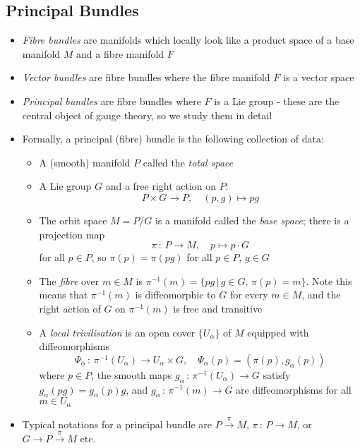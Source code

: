 \documentclass[12pt,a4paper]{article}
\numberwithin{equation}{section}
\begin{document}
	\subsection{Principal Bundles}
	\begin{itemize}
		\item \textit{Fibre bundles} are manifolds which locally look like a product space of a base manifold $M$ and a fibre manifold $F$
		\item \textit{Vector bundles} are fibre bundles where the fibre manifold $F$ is a vector space
		\item \textit{Principal bundles} are fibre bundles where $F$ is a Lie group - these are the central object of gauge theory, so we study them in detail
		\item Formally, a principal (fibre) bundle is the following collection of data:
		\begin{itemize}
			\item A (smooth) manifold $P$ called the \textit{total space}
			\item A Lie group $G$ and a free right action on $P$:
			\begin{equation}
				P\times G\to P,\quad (p,g)\mapsto pg
			\end{equation}
			\item The orbit space $M=P/G$ is a manifold called the \textit{base space}; there is a projection map
			\begin{equation}
				\pi\,:\,P\to M,\quad p\mapsto p\cdot G
			\end{equation}
			for all $p\in P$, so $\pi(p)=\pi(pg)$ for all $p\in P,\,g\in G$
			\item The \textit{fibre} over $m\in M$ is $\pi^{-1}(m)=\{pg\,|\,g\in G,\,\pi(p)=m\}$. Note this means that $\pi^{-1}(m)$ is diffeomorphic to $G$ for every $m\in M$, and the right action of $G$ on $\pi^{-1}(m)$ is free and transitive
			\item A \textit{local trivilisation} is an open cover $\{U_{\alpha}\}$ of $M$ equipped with diffeomorphisms
			\begin{equation}
				\Psi_{\alpha}\,:\,\pi^{-1}(U_{\alpha})\to U_{\alpha}\times G,\quad \Psi_{\alpha}(p)=(\pi(p),g_{\alpha}(p))
			\end{equation}
			where $p\in P$, the smooth maps $g_{\alpha}\,:\,\pi^{-1}(U_{\alpha})\to G$ satisfy $g_{\alpha}(pg)=g_{\alpha}(p)g$, and $g_{\alpha}\,:\,\pi^{-1}(m)\to G$ are diffeomorphisms for all $m\in U_{\alpha}$
		\end{itemize}
		\item Typical notations for a principal bundle are $P\xrightarrow{\pi}M$, $\pi\,:\,P\to M$, or $G\to P\xrightarrow{\pi}M$ etc.

\end{itemize}
\end{document}
